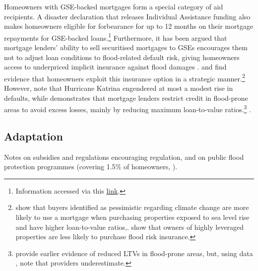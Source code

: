 \documentclass[12pt]{article}
\begin{document}
Homeowners with GSE-backed mortgages form a special category of aid recipients. A disaster declaration that releases Individual Assistance funding also makes homeowners eligible for forbearance for up to 12 months on their mortgage repayments for GSE-backed loans.\footnote{Information accessed via this \hyperlink{https://www.fhfa.gov/homeowners-and-homebuyers/mortgage-assistance/disaster-assistance}{link}.} Furthermore, it has been argued that mortgage lenders' ability to sell securitised mortgages to GSEs encourages them not to adjust loan conditions to flood-related default risk, giving homeowners access to underpriced implicit insurance against flood damages  \citep{keenan2020underwaterwriting,sastry2023insurers}. \cite{bakkensen2025leveraging} and \cite{liaomulder2026homeequity} find evidence that homeowners exploit this insurance option in a strategic manner.\footnote{\cite{bakkensen2025leveraging} show that buyers identified as pessimistic regarding climate change are more likely to use a mortgage when purchasing properties exposed to sea level rise and have higher loan-to-value ratios,. \cite{liaomulder2026homeequity} show that owners of highly leveraged properties are less likely to purchase flood risk insurance.} However, \cite{gallagher2017household} note that Hurricane Katrina engendered at most a modest rise in defaults, while \cite{sastry2026bears} demonstrates that mortgage lenders restrict credit in flood-prone areas to avoid excess losses, mainly by reducing maximum loan-to-value ratios.\footnote{\cite{nguyen2022climate} provide earlier evidence of reduced LTVs in flood-prone areas, but, using data , note that providers underestimate.} \citep{qin2026flood}. 


\subsection{Adaptation}

Notes on subsidies and regulations encouraging regulation, and on public flood protection programmes (covering 1.5$\%$ of homeowners, \citealp{qin2026flood}).



\end{document}
